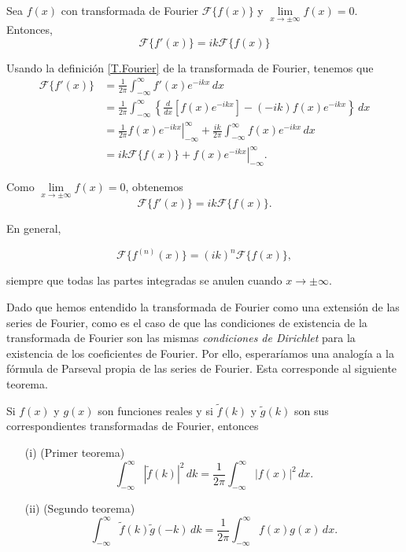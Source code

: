 \begin{propo}
Sea $f(x)$ con transformada de Fourier $\mathcal{F}\{f(x)\}$ y $\lim\limits_{x \to \pm \infty} f(x) = 0$. Entonces, 
$$\boxed{\mathcal{F}\{f'(x)\} = i k \mathcal{F}\{f(x)\}}$$
\end{propo}

\begin{demo}
Usando la definición \eqref{T.Fourier} de la transformada de Fourier, tenemos que 
\begin{align*}
    \mathcal{F}\{f'(x)\} &= \frac{1}{2\pi} \int_{- \infty}^{\infty} f'(x) e^{-ikx} \,dx \\
    &= \frac{1}{2\pi} \int_{- \infty}^{\infty} \left\{ \frac{d}{dx}\left[ f(x) e^{-ikx} \right]  - (-ik) f(x) e^{-ikx} \right\}\,dx \\
    &= \frac{1}{2\pi} \left. f(x) e^{-ikx} \right|_{-\infty}^{\infty} + \frac{ik}{2\pi} \int_{- \infty}^{\infty}  f(x) e^{-ikx} \,dx \\
    &=  ik \mathcal{F}\{f(x)\} + \left. f(x) e^{-ikx} \right|_{-\infty}^{\infty}.
\end{align*}

Como  $\lim\limits_{x \to \pm \infty} f(x) = 0$, obtenemos
$$\mathcal{F}\{f'(x)\} = i k \mathcal{F}\{f(x)\}.$$
\end{demo}

En general,
\begin{shaded}
$$\mathcal{F}\{f^{(n)} (x)\} = (i k)^n \mathcal{F}\{f(x)\},$$    
\end{shaded}

siempre que todas las partes integradas se anulen cuando $x \to \pm \infty$.

Dado que hemos entendido la transformada de Fourier como una extensión de las series de Fourier, como es el caso de que las condiciones de existencia de la transformada de Fourier son las mismas \emph{condiciones de Dirichlet} para la existencia de los coeficientes de Fourier. Por ello, esperaríamos una analogía a la fórmula de Parseval propia de las series de Fourier. Esta corresponde al siguiente teorema.

\begin{teorema}[de Parseval]
Si $f(x)$ y $g(x)$ son funciones reales y si $\tilde{f}(k)$ y $\tilde{g}(k)$ son sus correspondientes transformadas de Fourier, entonces

\begin{itemize}
    \item[(i)] (Primer teorema)
    $$\int_{-\infty}^{\infty} |\tilde{f}(k)|^2\, dk = \frac{1}{2\pi} \int_{-\infty}^{\infty} |f(x)|^2 \, dx. $$
    
    \item[(ii)] (Segundo teorema)
    $$\int_{-\infty}^{\infty} \tilde{f}(k) \tilde{g}(-k) \, dk = \frac{1}{2\pi} \int_{-\infty}^{\infty} f(x) g(x) \, dx. $$
    
\end{itemize}
\end{teorema}

